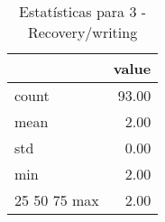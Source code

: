 \begin{table}[htbp]
\caption{Estatísticas para 3 - Recovery/writing}
\label{tab:3_-_recovery_writing_summary}
\begin{tabular}{lr}
\toprule
 & value \\
\midrule
count & 93.00 \\
mean & 2.00 \\
std & 0.00 \\
min & 2.00 \\
25%
50%
75%
max & 2.00 \\
\bottomrule
\end{tabular}
\end{table}
